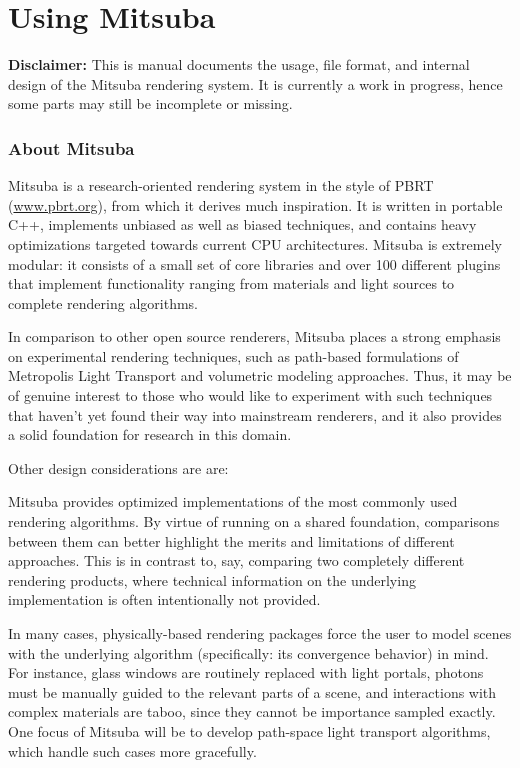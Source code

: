 \part{Using Mitsuba}
\textbf{Disclaimer:} This is manual documents the usage, file format, and
internal design of the Mitsuba rendering system. It is currently a work 
in progress, hence some parts may still be incomplete or missing.

\section{About Mitsuba}
Mitsuba is a research-oriented rendering system in the style of PBRT 
(\url{www.pbrt.org}), from which it derives much inspiration.
It is written in portable C++, implements unbiased as well 
as biased techniques, and contains heavy optimizations targeted 
towards current CPU architectures. 
Mitsuba is extremely modular: it consists of a small set of core libraries 
and over 100 different plugins that implement functionality ranging 
from materials and light sources to complete rendering algorithms.

In comparison to other open source renderers, Mitsuba places a strong 
emphasis on experimental rendering techniques, such as path-based 
formulations of Metropolis Light Transport and volumetric
modeling approaches. Thus, it may be of genuine interest to those who
would like to experiment with such techniques that haven't yet found 
their way into mainstream renderers, and it also provides a solid 
foundation for research in this domain.

Other design considerations are are:

Mitsuba provides optimized implementations of the most commonly 
used rendering algorithms. By virtue of running on a shared foundation, comparisons between them can
better highlight the merits and limitations of different approaches. This is in contrast to, say, 
comparing two completely different rendering products, where technical information on the underlying 
implementation is often intentionally not provided.

In many cases, physically-based rendering packages force the user to model scenes with the underlying 
algorithm (specifically: its convergence behavior) in mind. For instance, glass windows are routinely 
replaced with light portals, photons must be manually guided to the relevant parts of a scene, and 
interactions with complex materials are taboo, since they cannot be importance sampled exactly. 
One focus of Mitsuba will be to develop path-space light transport algorithms, which handle such 
cases more gracefully.

